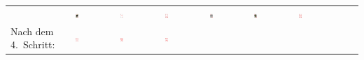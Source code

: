 \begin{tabular}{m{30mm}m{11mm}m{11mm}m{11mm}m{11mm}m{11mm}m{11mm}m{11mm}m{11mm}}
&
\includegraphics[width=0.08\textwidth]{./inf/SEKII/19_Java_Sortierverfahren/HerzBube.png}
&
\includegraphics[width=0.08\textwidth]{./inf/SEKII/19_Java_Sortierverfahren/HerzAs.png}
&
\includegraphics[width=0.08\textwidth]{./inf/SEKII/19_Java_Sortierverfahren/Herz7.png}
&
\includegraphics[width=0.08\textwidth]{./inf/SEKII/19_Java_Sortierverfahren/HerzKoenig.png}
&
\includegraphics[width=0.08\textwidth]{./inf/SEKII/19_Java_Sortierverfahren/HerzDame.png}
&
\includegraphics[width=0.08\textwidth]{./inf/SEKII/19_Java_Sortierverfahren/Herz9.png}
\\
Nach dem 4.\ Schritt: &
\includegraphics[width=0.08\textwidth]{./inf/SEKII/19_Java_Sortierverfahren/Herz7.png}
&
\includegraphics[width=0.08\textwidth]{./inf/SEKII/19_Java_Sortierverfahren/Herz8.png}
&
\includegraphics[width=0.08\textwidth]{./inf/SEKII/19_Java_Sortierverfahren/Herz10.png}

\end{tabular}
